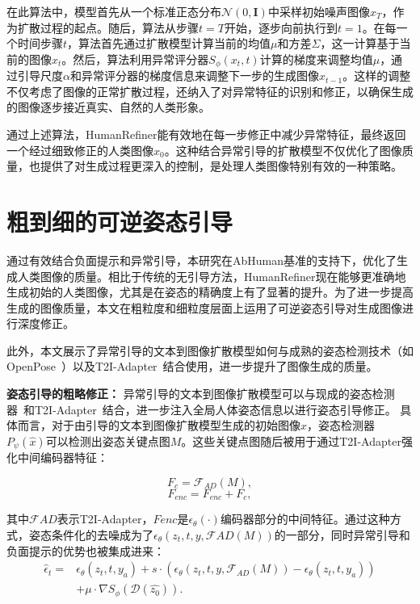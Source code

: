 在此算法中，模型首先从一个标准正态分布$\mathcal{N}(0, \mathbf{I})$中采样初始噪声图像$x_{T}$，作为扩散过程的起点。随后，算法从步骤$t=T$开始，逐步向前执行到$t=1$。在每一个时间步骤$t$，算法首先通过扩散模型计算当前的均值$\mu$和方差$\Sigma$，这一计算基于当前的图像$x_t$。然后，算法利用异常评分器$S_{\phi}(x_{t}, t)$计算的梯度来调整均值$\mu$，通过引导尺度$\alpha$和异常评分器的梯度信息来调整下一步的生成图像$x_{t-1}$。这样的调整不仅考虑了图像的正常扩散过程，还纳入了对异常特征的识别和修正，以确保生成的图像逐步接近真实、自然的人类形象。

通过上述算法，HumanRefiner能有效地在每一步修正中减少异常特征，最终返回一个经过细致修正的人类图像$x_0$。这种结合异常引导的扩散模型不仅优化了图像质量，也提供了对生成过程更深入的控制，是处理人类图像特别有效的一种策略。


\section{粗到细的可逆姿态引导}

通过有效结合负面提示和异常引导，本研究在AbHuman基准的支持下，优化了生成人类图像的质量。相比于传统的无引导方法，HumanRefiner现在能够更准确地生成初始的人类图像，尤其是在姿态的精确度上有了显著的提升。为了进一步提高生成的图像质量，本文在粗粒度和细粒度层面上运用了可逆姿态引导对生成图像进行深度修正。

此外，本文展示了异常引导的文本到图像扩散模型如何与成熟的姿态检测技术（如OpenPose~\cite{open_pose_cao2017realtime}）以及T2I-Adapter~\cite{t2i_adapter}结合使用，进一步提升了图像生成的质量。

\textbf{姿态引导的粗略修正：} 异常引导的文本到图像扩散模型可以与现成的姿态检测器~\cite{open_pose_cao2017realtime}和T2I-Adapter~\cite{t2i_adapter}结合，进一步注入全局人体姿态信息以进行姿态引导修正。
具体而言，对于由引导的文本到图像扩散模型生成的初始图像$\hat{x}$，姿态检测器$P_\psi(\hat{x})$可以检测出姿态关键点图$M$。这些关键点图随后被用于通过T2I-Adapter强化中间编码器特征：

\begin{equation}
    F_c = \mathcal{F}_{AD} (M),
\end{equation}
\vspace{-5.5mm}
\begin{equation}
    F_{enc} = F_{enc} + F_c,
\end{equation}

其中$\mathcal{F}{AD}$表示T2I-Adapter，$F{enc}$是$\epsilon_\theta(\cdot)$编码器部分的中间特征。通过这种方式，姿态条件化的去噪成为了$\epsilon_\theta(z_t, t, y, \mathcal{F}{AD}(M))$的一部分，同时异常引导和负面提示的优势也被集成进来：
\begin{equation}\label{eq9}
\begin{split}
    \hat{\epsilon}_t= & \epsilon_\theta(z_t, t, y_a) + s \cdot (\epsilon_\theta(z_t, t, y, \mathcal{F}_{AD}(M)) - \epsilon_\theta(z_t , t, y_a)) \\
& + \mu \cdot \nabla S_\phi(\mathcal{D}(\hat{z_0})).  
\end{split}  
\end{equation}

